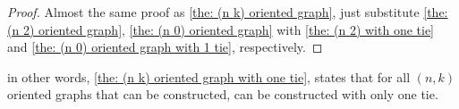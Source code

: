 \begin{proof}
  Almost the same proof as \cref{the: (n k) oriented graph},
  just substitute \cref{the: (n 2) oriented graph},
  \cref{the: (n 0) oriented graph} with
  \cref{the: (n 2) with one tie}
  and \cref{the: (n 0) oriented graph with 1 tie},
  respectively.
\end{proof}

in other words,
\cref{the: (n k) oriented graph with one tie},
states that for all \((n, k)\) oriented graphs
that can be constructed, can be constructed with only one tie.

